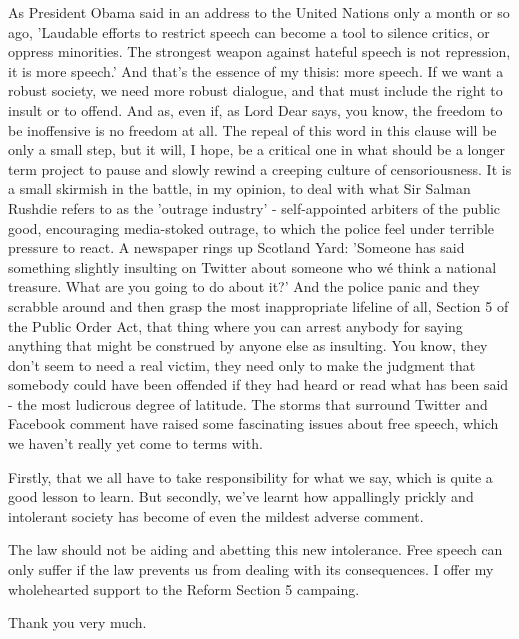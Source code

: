 \documentclass[11pt, a4paper]{article}
\begin{document}
As President Obama said in an address to the United Nations only a month or so ago, 'Laudable efforts to restrict speech can become a tool to silence critics, or oppress minorities. The strongest weapon against hateful speech is not repression, it is more speech.'
And that's the essence of my thisis: more speech. If we want a robust society, we need more robust dialogue, and that must include the right to insult or to offend. And as, even if, as Lord Dear says, you know, the freedom to be inoffensive is no freedom at all. The repeal of this word in this clause will be only a small step, but it will, I hope, be a critical one in what should be a longer term project to pause and slowly rewind a creeping culture of censoriousness.
It is a small skirmish in the battle, in my opinion, to deal with what Sir Salman Rushdie refers to as the 'outrage industry' - self-appointed arbiters of the public good, encouraging media-stoked outrage, to which the police feel under terrible pressure to react.
A newspaper rings up Scotland Yard: 'Someone has said something slightly insulting on Twitter about someone who wé think a national treasure. What are you going to do about it?'
And the police panic and they scrabble around and then grasp the most inappropriate lifeline of all, Section 5 of the Public Order Act, that thing where you can arrest anybody for saying anything that might be construed by anyone else as insulting.
You know, they don't seem to need a real victim, they need only to make the judgment that somebody could have been offended if they had heard or read what has been said - the most ludicrous degree of latitude.
The storms that surround Twitter and Facebook comment have raised some fascinating issues about free speech, which we haven't really yet come to terms with.

Firstly, that we all have to take responsibility for what we say, which is quite a good lesson to learn.
But secondly, we've learnt how appallingly prickly and intolerant society has become of even the mildest adverse comment.

The law should not be aiding and abetting this new intolerance.  Free speech can only suffer if the law prevents us from dealing with its consequences. I offer my wholehearted support to the Reform Section 5 campaing.

Thank you very much.
\end{document}
